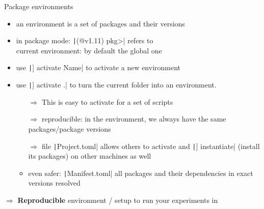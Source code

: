 \documentclass[aspectratio=169, 11pt, handout]{beamer}
\begin{document}
    \begin{frame}{Package environments}
        \begin{itemize}
            \item an \alert{environment} is a set of packages and their versions
            \pause
            \item in package mode: \texttt|(@v1.11) pkg>| refers to\\
            current environment: by default the global one
            \pause
            \item use \texttt|] activate Name| to activate a new environment
            \pause
            \item use \texttt|] activate .| to turn the current folder into an environment.
            \begin{itemize}
                \item[$\Rightarrow$] This is easy to activate for a set of scripts
                \pause
                \item[$\Rightarrow$] reproducible: in the environment,
                we always have the same packages/package versions
                \pause
                \item[$\Rightarrow$] file \texttt|Project.toml| allows others to
                activate and \texttt|] instantiate| (install its packages) on other machines as well
                \pause
                \item even safer: \texttt|Manifest.toml| all packages and their dependencies in \alert{exact versions} resolved
            \end{itemize}
        \end{itemize}
        \pause
        \alert{\textbf{$\Rightarrow$}} \textbf{Reproducible} environment / setup to run your experiments in
    \end{frame}
\end{document}
